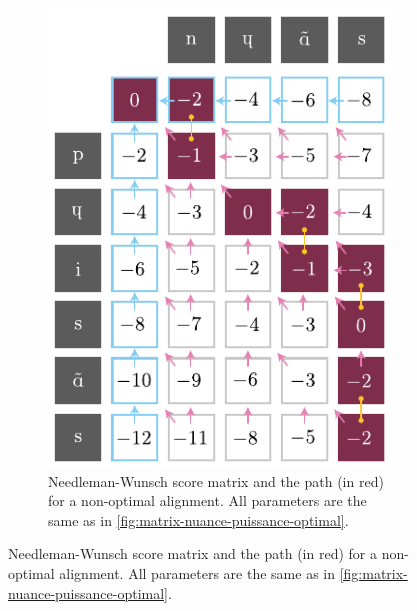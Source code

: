 \begin{figure}
\begin{minipage}[t]{0.6\textwidth}
\begin{algorithm}[H]
{        \BlankLine

        \Return\! \ScoreMatrixIdx{$\len(\WordA)$}{$\len(\WordB)$}\;
    }
    
    \caption{Needleman-Wunsch}
    \label{alg:needleman-wunsch}
\end{algorithm}

\end{minipage}%
\hfill
\begin{minipage}[t]{0.35\textwidth}

\begin{figure}[H]
    \centering
    \includegraphics[width=0.9\linewidth]{assets/illustrator/matrix-nuance-puissance-non-optimal.pdf}
    \caption{Needleman-Wunsch score matrix and the path (in red) for a non-optimal alignment. All parameters are the same as in \autoref{fig:matrix-nuance-puissance-optimal}.}
    \label{fig:matrix-nuance-puissance-non-optimal}
\end{figure}

\end{minipage}
\end{figure}

